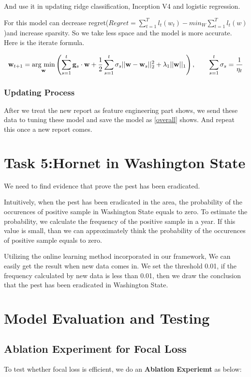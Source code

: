 \documentclass[12pt]{article}
\begin{document}
And use it in updating ridge classification, Inception V4 and logistic regression.

For this model can decrease regret($Regret=\sum_{t=1}^T l_t(w_t)-min_{W}\sum_{t=1}^Tl_t(w)$)and increase sparsity. So  we take less space and the model is more accurate. Here is the iterate formula.



\begin{equation}\mathbf{w}_{t+1} = \underset{\rm \mathbf{w}}{\rm arg\ min}\left(\displaystyle\sum_{s=1}^t {\mathbf{g}_s \cdot \mathbf{w}} + \frac 12 \displaystyle\sum_{s=1}^t {\sigma_s||\mathbf{w} - \mathbf{w}_s||_2^2} + \lambda_1||\mathbf{w}||_1\right),\qquad \sum_{s=1}^t \sigma_s = \frac 1{\eta_t}\end{equation}

\subsubsection{Updating Process}
After we treat the new report as feature engineering part shows, we send these data to tuning these model and save the model as \ref{overall} shows. And repeat this once a new report comes.


\section{Task 5:Hornet in Washington State}
We need to find evidence that prove the pest has been eradicated.

Intuitively, when the pest has been eradicated in the area, the probability of the occurences of positive sample in Washington State equals to zero. To estimate the probability, we calculate the frequency of the positive sample in a year. If this value is small, than we can approximately think the probability of the occurences of positive sample equals to zero.

Utilizing the online learning method incorporated in our framework, We can easily get the result when new data comes in. We set the threshold 0.01, if the frequency calculated by new data is less than 0.01, then we draw the conclusion that the pest has been eradicated in Washington State.


\section{Model Evaluation and Testing}
\subsection{Ablation Experiment for Focal Loss }
To test whether focal loss is efficient, we do an \textbf{Ablation Experiemt }as below:
\end{document}
